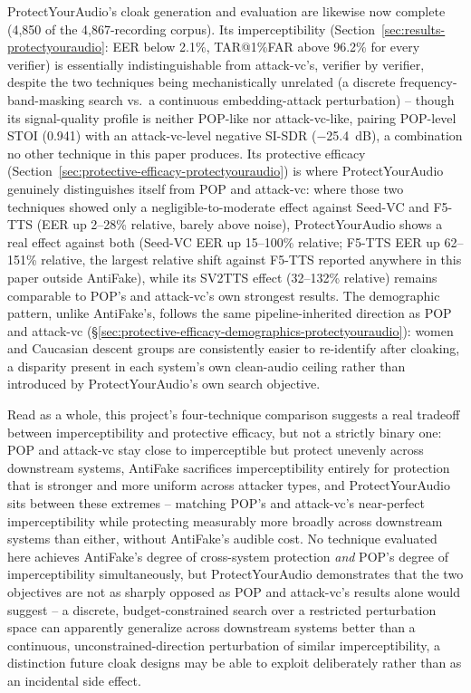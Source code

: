 \documentclass[11pt]{article}
\begin{document}
ProtectYourAudio's cloak generation and evaluation are likewise now
complete (4,850 of the 4,867-recording corpus). Its imperceptibility
(Section~\ref{sec:results-protectyouraudio}: EER below 2.1\%,
TAR@1\%FAR above 96.2\% for every verifier) is essentially
indistinguishable from attack-vc's, verifier by verifier, despite the
two techniques being mechanistically unrelated (a discrete
frequency-band-masking search vs.\ a continuous embedding-attack
perturbation) -- though its signal-quality profile is neither POP-like
nor attack-vc-like, pairing POP-level STOI (0.941) with an
attack-vc-level negative SI-SDR ($-$25.4~dB), a combination no other
technique in this paper produces. Its protective efficacy
(Section~\ref{sec:protective-efficacy-protectyouraudio}) is where
ProtectYourAudio genuinely distinguishes itself from POP and attack-vc:
where those two techniques showed only a negligible-to-moderate effect
against Seed-VC and F5-TTS (EER up 2--28\% relative, barely above
noise), ProtectYourAudio shows a real effect against both (Seed-VC EER
up 15--100\% relative; F5-TTS EER up 62--151\% relative, the largest
relative shift against F5-TTS reported anywhere in this paper outside
AntiFake), while its SV2TTS effect (32--132\% relative) remains
comparable to POP's and attack-vc's own strongest results. The
demographic pattern, unlike AntiFake's, follows the same
pipeline-inherited direction as POP and attack-vc
(\S\ref{sec:protective-efficacy-demographics-protectyouraudio}): women
and Caucasian descent groups are consistently easier to re-identify
after cloaking, a disparity present in each system's own clean-audio
ceiling rather than introduced by ProtectYourAudio's own search
objective.

Read as a whole, this project's four-technique comparison suggests a
real tradeoff between imperceptibility and protective efficacy, but
not a strictly binary one: POP and attack-vc stay close to
imperceptible but protect unevenly across downstream systems, AntiFake
sacrifices imperceptibility entirely for protection that is stronger
and more uniform across attacker types, and ProtectYourAudio sits
between these extremes -- matching POP's and attack-vc's near-perfect
imperceptibility while protecting measurably more broadly across
downstream systems than either, without AntiFake's audible cost. No
technique evaluated here achieves AntiFake's degree of cross-system
protection \emph{and} POP's degree of imperceptibility simultaneously,
but ProtectYourAudio demonstrates that the two objectives are not as
sharply opposed as POP and attack-vc's results alone would suggest --
a discrete, budget-constrained search over a restricted perturbation
space can apparently generalize across downstream systems better than
a continuous, unconstrained-direction perturbation of similar
imperceptibility, a distinction future cloak designs may be able to
exploit deliberately rather than as an incidental side effect.
\end{document}
